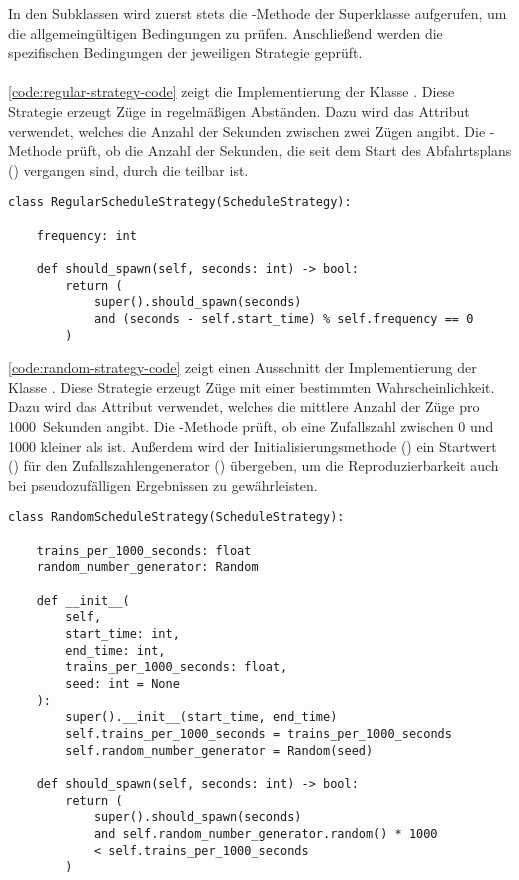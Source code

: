 In den Subklassen wird zuerst stets die -Methode der Superklasse aufgerufen, um die allgemeingültigen Bedingungen zu prüfen. Anschließend werden die spezifischen Bedingungen der jeweiligen Strategie geprüft.\\
\\
\autoref{code:regular-strategy-code} zeigt die Implementierung der Klasse . Diese Strategie erzeugt Züge in regelmäßigen Abständen. Dazu wird das Attribut  verwendet, welches die Anzahl der Sekunden zwischen zwei Zügen angibt. Die -Methode prüft, ob die Anzahl der Sekunden, die seit dem Start des Abfahrtsplans () vergangen sind, durch die  teilbar ist.\\

\lstset{language=python}
\begin{lstlisting}[caption={Ausschnitt aus der Klasse \code{RegularScheduleStrategy} mit der Implementierung der Methode \code{should\_spawn}.}, label=code:regular-strategy-code]
class RegularScheduleStrategy(ScheduleStrategy):

    frequency: int

    def should_spawn(self, seconds: int) -> bool:
        return (
            super().should_spawn(seconds)
            and (seconds - self.start_time) % self.frequency == 0
        )
\end{lstlisting}

\autoref{code:random-strategy-code} zeigt einen Ausschnitt der Implementierung der Klasse . Diese Strategie erzeugt Züge mit einer bestimmten Wahrscheinlichkeit. Dazu wird das Attribut  verwendet, welches die mittlere Anzahl der Züge pro 1000~Sekunden angibt. Die -Methode prüft, ob eine Zufallszahl zwischen 0 und 1000 kleiner als  ist. Außerdem wird der Initialisierungsmethode () ein Startwert () für den Zufallszahlengenerator () übergeben, um die Reproduzierbarkeit auch bei pseudozufälligen Ergebnissen zu gewährleisten.

\begin{lstlisting}[caption={Ausschnitt aus der Klasse \code{RandomScheduleStrategy} mit der Implementierung der Methode \code{should\_spawn}.}, label=code:random-strategy-code]
class RandomScheduleStrategy(ScheduleStrategy):

    trains_per_1000_seconds: float
    random_number_generator: Random

    def __init__(
        self,
        start_time: int,
        end_time: int,
        trains_per_1000_seconds: float,
        seed: int = None
    ):
        super().__init__(start_time, end_time)
        self.trains_per_1000_seconds = trains_per_1000_seconds
        self.random_number_generator = Random(seed)

    def should_spawn(self, seconds: int) -> bool:
        return (
            super().should_spawn(seconds)
            and self.random_number_generator.random() * 1000
            < self.trains_per_1000_seconds
        )
\end{lstlisting}

